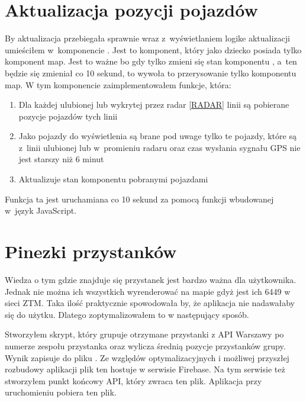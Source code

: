 \documentclass{SGGW-thesis}
\begin{document}
\section{Aktualizacja pozycji pojazdów}
By aktualizacja przebiegała sprawnie wraz z~wyświetlaniem logike aktualizacji umieściłem w~komponencie .
Jest to komponent, który jako dziecko posiada tylko komponent map.
Jest to ważne bo gdy tylko zmieni się stan komponentu , a~ten będzie się zmieniał co 10 sekund, to wywoła to przerysowanie tylko komponentu map.
W tym komponencie zaimplementowałem funkcje, która:
\begin{enumerate}
  \item{Dla każdej ulubionej lub wykrytej przez radar \ref{RADAR} linii są pobierane pozycje pojazdów tych linii}
  \item{Jako pojazdy do wyświetlenia są brane pod uwage tylko te pojazdy, które są z~linii ulubionej lub w~promieniu radaru oraz czas wysłania sygnału GPS nie jest starszy niż 6 minut}
  \item{Aktualizuje stan komponentu  pobranymi pojazdami}
\end{enumerate}
Funkcja ta jest uruchamiana co 10 sekund za pomocą funkcji  wbudowanej w~język JavaScript.

\section{Pinezki przystanków}
Wiedza o tym gdzie znajduje się przystanek jest bardzo ważna dla użytkownika.
Jednak nie można ich wszystkich wyrenderować na mapie gdyż jest ich 6449 w sieci ZTM.
Taka ilość praktycznie spowodowała by, że aplikacja nie nadawałaby się do użytku.
Dlatego zoptymalizowałem to w następujący sposób.

\label{FIREBASE}
Stworzyłem skrypt, który grupuje otrzymane przystanki z API Warszawy po numerze zespołu przystanka oraz wylicza średnią pozycje przystanków grupy.
Wynik zapisuje do pliku .
Ze względów optymalizacyjnych i możliwej przyszłej rozbudowy aplikacji plik ten hostuje w serwisie Firebase.
Na tym serwisie też stworzyłem punkt końcowy API, który zwraca ten plik.
Aplikacja przy uruchomieniu pobiera ten plik.
\end{document}
